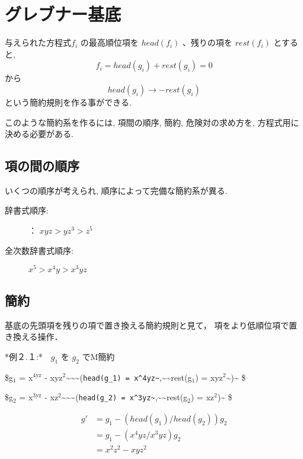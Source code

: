 \documentclass[a4j]{jarticle}
\begin{document}
\section{グレブナー基底}
\label{sec:org7819f1b}

与えられた方程式\(f_i\) の最高順位項を \(head(f_i)\) 、残りの項を
\(rest(f_i)\) とすると, $$f_i = head(g_i) + rest(g_i)  = 0$$ から
$$head(g_i) \rightarrow - rest(g_i)$$ という簡約規則を作る事ができる.

このような簡約系を作るには, 項間の順序, 簡約, 危険対の求め方を,
方程式用に決める必要がある.

\subsection{項の間の順序}
\label{sec:org7f8b232}

いくつの順序が考えられ, 順序によって完備な簡約系が異る.

\begin{description}
\item[{辞書式順序:}] ： \(xyz > yz^3 > z^5\)

\item[{全次数辞書式順序:}] \(x^5 > x^4y > x^3yz\)
\end{description}

\subsection{簡約}
\label{sec:org981413d}

基底の先頭項を残りの項で置き換える簡約規則と見て，
項をより低順位項で置き換える操作．

*例２.１:*　\(g_1\) を \(g_2\) でM簡約

\$g\(_{\text{1}}\) = x\(^{\text{4yz}}\) - xyz\(^{\text{2}}\)\textasciitilde{}\textasciitilde{}\textasciitilde{}(\texttt{head(g\_1) = x\textasciicircum{}4yz\textasciitilde{}},\textasciitilde{}\textasciitilde{}rest(g\(_{\text{1}}\)) = xyz\(^{\text{2}}\)\textasciitilde{})\textasciitilde{} \$

\$g\(_{\text{2}}\) = x\(^{\text{3yz}}\) - xz\(^{\text{2}}\)\textasciitilde{}\textasciitilde{}\textasciitilde{}(\texttt{head(g\_2) = x\textasciicircum{}3yz\textasciitilde{}},\textasciitilde{}\textasciitilde{}rest(g\(_{\text{2}}\)) = xz\(^{\text{2}}\))\textasciitilde{} \$

$$\begin{array}{ll}
g' & = g_1 - ( head(g_1) / head(g_2) ) g_2 \\
   & = g_1 - ( x^4yz / x^3yz ) g_2 \\
   & = x^2z^2 - xyz^2
\end{array}$$
\end{document}
